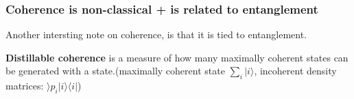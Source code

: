 \documentclass{article}
\begin{document}
\subsubsection{Coherence is non-classical + is related to entanglement}
Another intersting note on coherence, is that it is tied to entanglement. 



\begin{comment}   
Coherences: 
For,
\begin{align}
    |\psi\rangle =a|0\rangle+be^{i\theta}|1\rangle\\
    |\psi'\rangle =e^{i\phi}(a'|0\rangle+b'e^{i\theta'}|1\rangle)\\
\end{align}
in $|\psi\rangle$ there is perfect coherence between $|0\rangle$and $|1\rangle$ (for $\theta$ well defined). Defining $|\phi\rangle=|\psi\rangle+|\phi'\rangle$, with $\theta, \theta', \phi=0$ the probabilities add up classically. But with non-zero phases, they dont. Without coherence between states (ie non-zero controlled phase relations) we loose things like entanglement that make the probabilities non-classical.
\end{comment}

\textbf{Distillable coherence} is a measure of how many maximally coherent states can be generated with a state.(maximally coherent state $\sum_{i}|i\rangle$, incoherent density matrices: $\rangle p_i|i\rangle\langle i|$)
\end{document}
